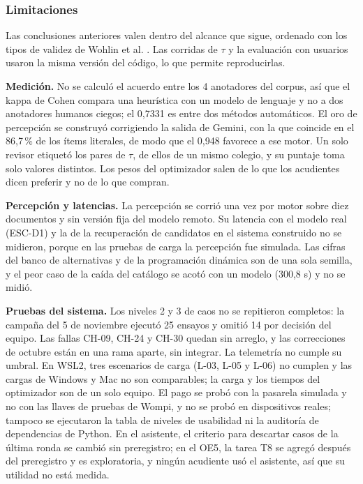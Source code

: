 \subsubsection{Limitaciones}
\label{sec:amenazas}

Las conclusiones anteriores valen dentro del alcance que sigue, ordenado con los tipos de validez de Wohlin et al. \citep{wohlin_experimentation_2012}. Las corridas de $\tau$ y la evaluación con usuarios usaron la misma versión del código, lo que permite reproducirlas.

\textbf{Medición.} No se calculó el acuerdo entre los 4 anotadores del corpus, así que el kappa de Cohen \citep{cohen_coefficient_1960} compara una heurística con un modelo de lenguaje y no a dos anotadores humanos ciegos; el 0,7331 es entre dos métodos automáticos. El oro de percepción se construyó corrigiendo la salida de Gemini, con la que coincide en el 86,7\,\% de los ítems literales, de modo que el 0,948 favorece a ese motor. Un solo revisor etiquetó los \calTauPares{} pares de $\tau$, \calTauColegioMayor{} de ellos de un mismo colegio, y su puntaje toma solo \calTauValores{} valores distintos. Los pesos del optimizador salen de lo que los acudientes dicen preferir y no de lo que compran.

\textbf{Percepción y latencias.} La percepción se corrió una vez por motor sobre diez documentos y sin versión fija del modelo remoto. Su latencia con el modelo real (ESC-D1) y la de la recuperación de candidatos en el sistema construido no se midieron, porque en las pruebas de carga la percepción fue simulada. Las cifras del banco de alternativas y de la programación dinámica son de una sola semilla, y el peor caso de la caída del catálogo se acotó con un modelo (300,8 s) y no se midió.

\textbf{Pruebas del sistema.} Los niveles 2 y 3 de caos no se repitieron completos: la campaña del 5 de noviembre ejecutó 25 ensayos y omitió 14 por decisión del equipo. Las fallas CH-09, CH-24 y CH-30 quedan sin arreglo, y las correcciones de octubre están en una rama aparte, sin integrar. La telemetría no cumple su umbral. En WSL2, tres escenarios de carga (L-03, L-05 y L-06) no cumplen y las cargas de Windows y Mac no son comparables; la carga y los tiempos del optimizador son de un solo equipo. El pago se probó con la pasarela simulada y no con las llaves de pruebas de Wompi, y no se probó en dispositivos reales; tampoco se ejecutaron la tabla de niveles de usabilidad ni la auditoría de dependencias de Python. En el asistente, el criterio para descartar casos de la última ronda se cambió sin preregistro; en el OE5, la tarea T8 se agregó después del preregistro y es exploratoria, y ningún acudiente usó el asistente, así que su utilidad no está medida.

